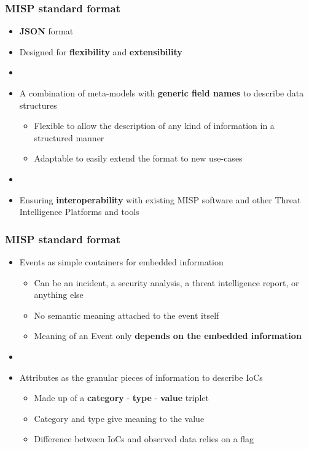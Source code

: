\begin{frame}
    \frametitle{MISP standard format}
    \begin{itemize}
        \item \textbf{JSON} format
        \item Designed for \textbf{flexibility} and \textbf{extensibility}
        \item []
        \item A combination of meta-models with \textbf{generic field names} to describe data structures
        \begin{itemize}
            \item Flexible to allow the description of any kind of information in a structured manner
            \item Adaptable to easily extend the format to new use-cases
        \end{itemize}
        \item []
        \item Ensuring \textbf{interoperability} with existing MISP software and other Threat Intelligence Platforms and tools
    \end{itemize}
\end{frame}

\begin{frame}
    \frametitle{MISP standard format}
    \begin{itemize}
        \item Events as simple containers for embedded information
        \begin{itemize}
            \item Can be an incident, a security analysis, a threat intelligence report, or anything else
            \item No semantic meaning attached to the event itself
            \item Meaning of an Event only \textbf{depends on the embedded information}
        \end{itemize}
        \item []
        \item Attributes as the granular pieces of information to describe IoCs
        \begin{itemize}
            \item Made up of a \textbf{category} - \textbf{type} - \textbf{value} triplet
            \item Category and type give meaning to the value
            \item Difference between IoCs and observed data relies on a flag
        \end{itemize}
    \end{itemize}
\end{frame}

